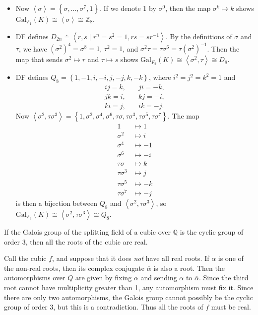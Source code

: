 \documentclass[10pt]{report}
\begin{document}
\begin{itemize}
	\item Now $\left\langle \sigma \right\rangle= \left\{ \sigma, \dots, \sigma^7, 1 \right\}$. If we denote 1 by $\sigma^0$, then the map $\sigma^k \mapsto k$ shows $\text{Gal}_{F_1}(K)\cong \left\langle \sigma \right\rangle\cong \mathbb{Z}_{8}$.
	\item DF defines $D_{2n} \doteq \left\langle r,s \;|\; r^n=s^2=1, rs=sr^{-1} \right\rangle$. By the definitions of $\sigma$ and $\tau$, we have $(\sigma^2)^4=\sigma^8=1$, $\tau^2=1$, and $\sigma^2\tau = \tau\sigma^6 = \tau (\sigma^2)^{-1}$. Then the map that sends $\sigma^2 \mapsto r$ and $\tau \mapsto s$ shows $\text{Gal}_{F_2}(K)\cong \left\langle \sigma^2, \tau \right\rangle\cong D_{8}$.
	\item DF defines $Q_8 = \left\{ 1,-1,i,-i,j,-j,k,-k \right\}$, where $i^2=j^2=k^2=1$ and
		\begin{align*}
			ij=k, &\quad ji=-k, \\
			jk=i, &\quad kj=-i, \\
			ki=j, &\quad ik=-j.
		\end{align*}
		Now $\left\langle \sigma^2,\tau\sigma^3 \right\rangle = \left\{ 1,\sigma^2,\sigma^4,\sigma^6,\tau\sigma,\tau\sigma^3,\tau\sigma^5,\tau\sigma^7 \right\}$. The map
		\begin{align*}
			1 &\mapsto 1 \\
			\sigma^2 &\mapsto i \\
			\sigma^4&\mapsto -1\\
			\sigma^6&\mapsto -i\\
			\tau\sigma&\mapsto k\\
			\tau\sigma^3&\mapsto j\\
			\tau\sigma^5&\mapsto -k\\
			\tau\sigma^7&\mapsto -j
		\end{align*}
		is then a bijection between $Q_8$ and $\left\langle \sigma^2,\tau\sigma^3 \right\rangle$, so $\text{Gal}_{F_3}(K) \cong \left\langle \sigma^2,\tau\sigma^3 \right\rangle \cong Q_8$.
\end{itemize}

\begin{exer}[14.2: 13]
	If the Galois group of the splitting field of a cubic over $\mathbb{Q}$ is the cyclic group of order 3, then all the roots of the cubic are real.
\end{exer}
Call the cubic $f$, and suppose that it does \textit{not} have all real roots. If $\alpha$ is one of the non-real roots, then its complex conjugate $\overline{\alpha} $ is also a root. Then the automorphisms over $Q$ are given by fixing $\alpha$ and sending $\alpha$ to $\overline{\alpha} $. Since the third root cannot have multiplicity greater than 1, any automorphism must fix it. Since there are only two automorphisms, the Galois group cannot possibly be the cyclic group of order 3, but this is a contradiction. Thus all the roots of $f$ must be real.
\end{document}
